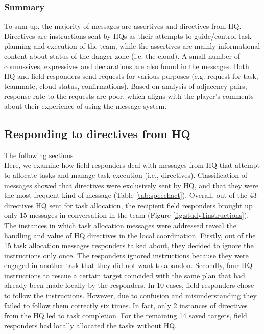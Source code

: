 \subsubsection{Summary}
To sum up, the majority of messages are assertives and directives from HQ. Directives are instructions sent by HQs as their attempts to guide/control task planning and execution of the team, while the assertives are mainly informational content about status of the danger zone (i.e. the cloud). A small number of commssives, expressives and declarations are also found in the messages. Both HQ and field responders send requests for various purposes (e.g. request for task, teammate, cloud status, confirmations). Based on analysis of adjacency pairs, response rate to the requests are poor, which aligns with the player's comments about their experience of using the message system.

\subsection{Responding to directives from HQ}\label{sec:study1directives}
The following sections \\

Here, we examine how field responders deal with messages from HQ that attempt to allocate tasks and manage task execution (i.e., directives). Classification of messages showed that directives were exclusively sent by HQ, and that they were the most frequent kind of message (Table \ref{tab:speechact}). Overall, out of the 43 directives HQ sent for task allocation, the recipient field responders brought up only 15 messages in conversation in the team (Figure \ref{fig:study1instructions}). The instances in which task allocation messages were addressed reveal the handling and value of HQ directives in the local coordination. Firstly, out of the 15 task allocation messages responders talked about, they decided to ignore the instructions only once. The responders ignored instructions because they were engaged in another task that they did not want to abandon. Secondly, four HQ instructions to rescue a certain target coincided with the same plan that had already been made locally by the responders. In 10 cases, field responders chose to follow the instructions. However, due to confusion and misunderstanding they failed to follow them correctly six times. In fact, only 2 instances of directives from the HQ led to task completion. For the remaining 14 saved targets, field responders had locally allocated the tasks without HQ.\\

